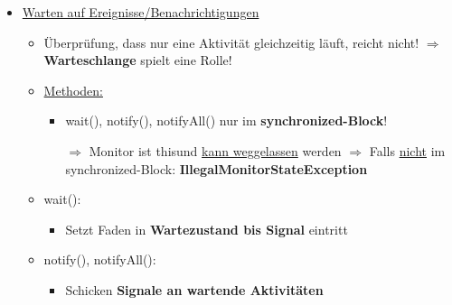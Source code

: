 \begin{itemize}
\item \underline{Warten auf Ereignisse/Benachrichtigungen}
\begin{itemize}
\item Überprüfung, dass nur eine Aktivität gleichzeitig läuft, reicht nicht!
$\Rightarrow$ \textbf{Warteschlange} spielt eine Rolle!
\newpage
\item \underline{Methoden:}
\begin{itemize}
\item wait(), notify(), notifyAll() nur im \textbf{synchronized-Block}!

$\Rightarrow$ Monitor ist \dq this\dq und \underline{kann weggelassen} werden
\newline
$\Rightarrow$ Falls \underline{nicht} im synchronized-Block: \textbf{IllegalMonitorStateException}
\end{itemize}
\item wait():
\begin{itemize}
\item Setzt Faden in \textbf{Wartezustand bis Signal} eintritt
					
\color{red}{$\Rightarrow$ IMMER in einer Schleife!}
\newline							
\color{red}{$\Rightarrow$ Bedingung VOR und NACH dem Warten prüfen!}
\end{itemize}
\item notify(), notifyAll():
\begin{itemize}
\item Schicken \textbf{Signale an wartende Aktivitäten}
							

\end{itemize}
\end{itemize}
\end{itemize}
